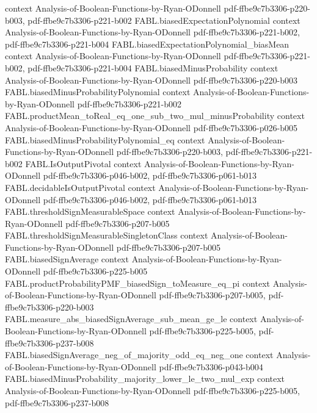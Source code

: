 \begin{theorem}
  {context}
  {Analysis-of-Boolean-Functions-by-Ryan-ODonnell}
  {pdf-ffbe9c7b3306-p220-b003,
    pdf-ffbe9c7b3306-p221-b002}
\proofstep
  {FABL.biasedExpectationPolynomial}
  {context}
  {Analysis-of-Boolean-Functions-by-Ryan-ODonnell}
  {pdf-ffbe9c7b3306-p221-b002,
    pdf-ffbe9c7b3306-p221-b004}
\proofstep
  {FABL.biasedExpectationPolynomial_biasMean}
  {context}
  {Analysis-of-Boolean-Functions-by-Ryan-ODonnell}
  {pdf-ffbe9c7b3306-p221-b002,
    pdf-ffbe9c7b3306-p221-b004}
\proofstep
  {FABL.biasedMinusProbability}
  {context}
  {Analysis-of-Boolean-Functions-by-Ryan-ODonnell}
  {pdf-ffbe9c7b3306-p220-b003}
\proofstep
  {FABL.biasedMinusProbabilityPolynomial}
  {context}
  {Analysis-of-Boolean-Functions-by-Ryan-ODonnell}
  {pdf-ffbe9c7b3306-p221-b002}
\proofstep
  {FABL.productMean_toReal_eq_one_sub_two_mul_minusProbability}
  {context}
  {Analysis-of-Boolean-Functions-by-Ryan-ODonnell}
  {pdf-ffbe9c7b3306-p026-b005}
\proofstep
  {FABL.biasedMinusProbabilityPolynomial_eq}
  {context}
  {Analysis-of-Boolean-Functions-by-Ryan-ODonnell}
  {pdf-ffbe9c7b3306-p220-b003,
    pdf-ffbe9c7b3306-p221-b002}
\proofstep
  {FABL.IsOutputPivotal}
  {context}
  {Analysis-of-Boolean-Functions-by-Ryan-ODonnell}
  {pdf-ffbe9c7b3306-p046-b002,
    pdf-ffbe9c7b3306-p061-b013}
\proofstep
  {FABL.decidableIsOutputPivotal}
  {context}
  {Analysis-of-Boolean-Functions-by-Ryan-ODonnell}
  {pdf-ffbe9c7b3306-p046-b002,
    pdf-ffbe9c7b3306-p061-b013}
\proofstep
  {FABL.thresholdSignMeasurableSpace}
  {context}
  {Analysis-of-Boolean-Functions-by-Ryan-ODonnell}
  {pdf-ffbe9c7b3306-p207-b005}
\proofstep
  {FABL.thresholdSignMeasurableSingletonClass}
  {context}
  {Analysis-of-Boolean-Functions-by-Ryan-ODonnell}
  {pdf-ffbe9c7b3306-p207-b005}
\proofstep
  {FABL.biasedSignAverage}
  {context}
  {Analysis-of-Boolean-Functions-by-Ryan-ODonnell}
  {pdf-ffbe9c7b3306-p225-b005}
\proofstep
  {FABL.productProbabilityPMF_biasedSign_toMeasure_eq_pi}
  {context}
  {Analysis-of-Boolean-Functions-by-Ryan-ODonnell}
  {pdf-ffbe9c7b3306-p207-b005,
    pdf-ffbe9c7b3306-p220-b003}
\proofstep
  {FABL.measure_abs_biasedSignAverage_sub_mean_ge_le}
  {context}
  {Analysis-of-Boolean-Functions-by-Ryan-ODonnell}
  {pdf-ffbe9c7b3306-p225-b005,
    pdf-ffbe9c7b3306-p237-b008}
\proofstep
  {FABL.biasedSignAverage_neg_of_majority_odd_eq_neg_one}
  {context}
  {Analysis-of-Boolean-Functions-by-Ryan-ODonnell}
  {pdf-ffbe9c7b3306-p043-b004}
\proofstep
  {FABL.biasedMinusProbability_majority_lower_le_two_mul_exp}
  {context}
  {Analysis-of-Boolean-Functions-by-Ryan-ODonnell}
  {pdf-ffbe9c7b3306-p225-b005,
    pdf-ffbe9c7b3306-p237-b008}

\end{theorem}
